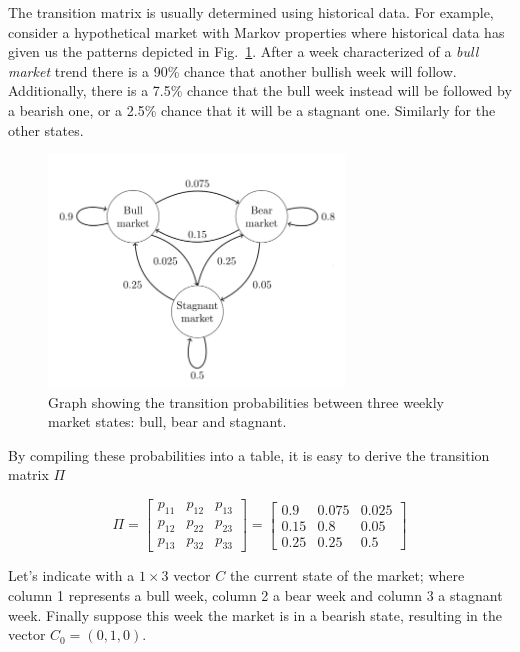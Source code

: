The transition matrix is usually determined using historical data. For example, consider a hypothetical market with Markov properties where historical data has given us the patterns depicted in Fig.~\ref{fig:markov_chain}.
After a week characterized of a \emph{bull market} trend there is a 90\% chance that another bullish week will follow. Additionally, there is a 7.5\% chance that the bull week instead will be followed by a bearish one, or a 2.5\% chance that it will be a stagnant one. Similarly for the other states. 

\begin{figure}[htb]
\centering
\includegraphics[width=0.7\textwidth]{figures/markov_chain}
\caption{Graph showing the transition probabilities between three weekly market states: bull, bear and stagnant.}
\label{fig:markov_chain}
\end{figure}

By compiling these probabilities into a table, it is easy to derive the transition matrix $\Pi$

\[\Pi = 
\begin{bmatrix}
p_{11} & p_{12} & p_{13} \\
p_{12} & p_{22} & p_{23} \\
p_{13} & p_{32} & p_{33}
\end{bmatrix} =
\begin{bmatrix}
0.9 & 0.075 & 0.025 \\
0.15 & 0.8 & 0.05 \\
0.25 & 0.25 & 0.5
\end{bmatrix} 
\]

Let's indicate with a $1 \times 3$ vector $C$ the current state of the market; where column 1 represents a bull week, column 2 a bear week and column 3 a stagnant week. Finally suppose this week the market is in a bearish state, resulting in the vector $C_0  = (0, 1, 0)$.


